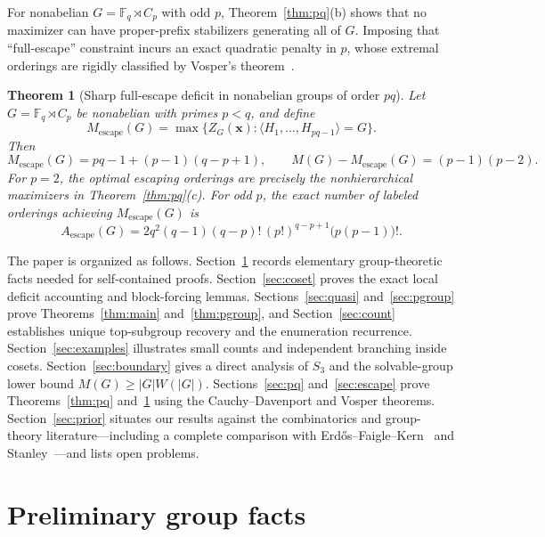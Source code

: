 \documentclass[11pt,reqno]{amsart}
\numberwithin{equation}{section}
\newtheorem{theorem}{Theorem}[section]
\theoremstyle{definition}
\theoremstyle{remark}
\newcommand{\F}{\mathbb{F}}
\newcommand{\Mesc}{M_{\mathrm{escape}}}
\begin{document}
For nonabelian $G=\F_q\rtimes C_p$ with odd $p$, Theorem~\ref{thm:pq}(b) shows that no maximizer can have proper-prefix stabilizers generating all of $G$. Imposing that ``full-escape'' constraint incurs an exact quadratic penalty in $p$, whose extremal orderings are rigidly classified by Vosper's theorem~\cite{Vos56}.

\begin{theorem}[Sharp full-escape deficit in nonabelian groups of order $pq$]
\label{thm:escape}
Let $G=\F_q \rtimes C_p$ be nonabelian with primes $p<q$, and define
\[
\Mesc(G) = \max\bigl\{Z_G(\mathbf{x}) : \langle H_1,\ldots,H_{pq-1}\rangle = G\bigr\}.
\]
Then
\begin{equation}
\label{eq:escape-val}
\Mesc(G) = pq - 1 + (p-1)(q-p+1),\qquad M(G) - \Mesc(G) = (p-1)(p-2).
\end{equation}
For $p=2$, the optimal escaping orderings are precisely the nonhierarchical maximizers in Theorem~\ref{thm:pq}(c). For odd $p$, the exact number of labeled orderings achieving $\Mesc(G)$ is
\begin{equation}
\label{eq:escape-count}
A_{\mathrm{escape}}(G) = 2 q^2 (q-1)(q-p)!\,(p!)^{q-p+1}\bigl(p(p-1)\bigr)!.
\end{equation}
\end{theorem}

The paper is organized as follows. Section~\ref{sec:prelim} records elementary group-theoretic facts needed for self-contained proofs. Section~\ref{sec:coset} proves the exact local deficit accounting and block-forcing lemmas. Sections~\ref{sec:quasi} and~\ref{sec:pgroup} prove Theorems~\ref{thm:main} and~\ref{thm:pgroup}, and Section~\ref{sec:count} establishes unique top-subgroup recovery and the enumeration recurrence. Section~\ref{sec:examples} illustrates small counts and independent branching inside cosets. Section~\ref{sec:boundary} gives a direct analysis of $S_3$ and the solvable-group lower bound $M(G)\ge |G|W(|G|)$. Sections~\ref{sec:pq} and~\ref{sec:escape} prove Theorems~\ref{thm:pq} and~\ref{thm:escape} using the Cauchy--Davenport and Vosper theorems. Section~\ref{sec:prior} situates our results against the combinatorics and group-theory literature---including a complete comparison with Erd\H{o}s--Faigle--Kern~\cite{EFK92} and Stanley~\cite{Sta05}---and lists open problems.

\section{Preliminary group facts}
\label{sec:prelim}
\end{document}
